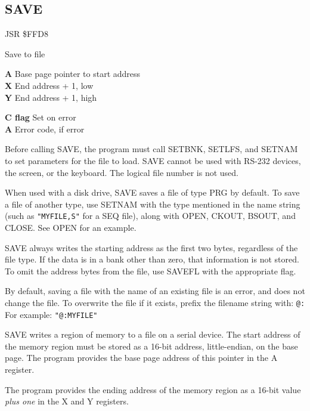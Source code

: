 \subsection{SAVE}
\label{KERNAL Jump Table!SAVE}
\begin{description}[leftmargin=2cm,style=nextline]
    \item [Address:] JSR \$FFD8
    \item [Description:] Save to file
    \item [Inputs:]
        \textbf{A} Base page pointer to start address \\
        \textbf{X} End address + 1, low \\
        \textbf{Y} End address + 1, high
    \item [Outputs:]
        \textbf{C flag} Set on error \\
        \textbf{A} Error code, if error
    \item [Remarks:]
        Before calling SAVE, the program must call SETBNK, SETLFS, and SETNAM to set parameters for the file to load. SAVE cannot be used with RS-232 devices, the screen, or the keyboard. The logical file number is not used.

        When used with a disk drive, SAVE saves a file of type PRG by default. To save a file of another type, use SETNAM with the type mentioned in the name string (such as \texttt{"MYFILE,S"} for a SEQ file), along with OPEN, CKOUT, BSOUT, and CLOSE. See OPEN for an example.

        SAVE always writes the starting address as the first two bytes, regardless of the file type. If the data is in a bank other than zero, that information is not stored. To omit the address bytes from the file, use SAVEFL with the appropriate flag.

        By default, saving a file with the name of an existing file is an error, and does not change the file. To overwrite the file if it exists, prefix the filename string with: \texttt{@:} For example: \texttt{"@:MYFILE"}

        SAVE writes a region of memory to a file on a serial device. The start address of the memory region must be stored as a 16-bit address, little-endian, on the base page. The program provides the base page address of this pointer in the A register.

        The program provides the ending address of the memory region as a 16-bit value \emph{plus one} in the X and Y registers.


\end{description}

